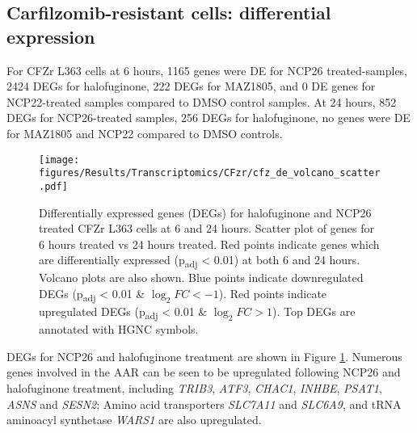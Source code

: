 
\afterpage{\clearpage}
\subsection{Carfilzomib-resistant cells: differential expression}

For CFZr L363 cells at 6 hours, 1165 genes were DE for NCP26 treated-samples, 2424 DEGs for halofuginone, 222 DEGs for MAZ1805, and 0 DE genes for NCP22-treated samples compared to DMSO control samples.
At 24 hours, 852 DEGs for NCP26-treated samples, 256 DEGs for halofuginone, no genes were DE for MAZ1805 and NCP22 compared to DMSO controls.
%
\begin{figure}[bht]
\centering
\texttt{[image: figures/Results/Transcriptomics/CFzr/cfz\_de\_volcano\_scatter.pdf]}
\caption[Differentially expressed genes CFZr L363 cells]{Differentially expressed genes (DEGs) for halofuginone and NCP26 treated CFZr L363 cells at 6 and 24 hours.
Scatter plot of genes for 6 hours treated vs 24 hours treated.
Red points indicate genes which are differentially expressed (p\textsubscript{adj} < 0.01) at both 6 and 24 hours.
Volcano plots are also shown.
Blue points indicate downregulated DEGs (p\textsubscript{adj} < 0.01 \& $\log_{2}FC < -1$).
Red points indicate upregulated DEGs (p\textsubscript{adj} < 0.01 \& $\log_{2}FC > 1$).
Top DEGs are annotated with HGNC symbols.
}
\label{fig:cfz_de}
\end{figure}
DEGs for NCP26 and halofuginone treatment are shown in Figure \ref{fig:cfz_de}.
Numerous genes involved in the AAR can be seen to be upregulated following NCP26 and halofuginone treatment, including \textit{TRIB3}, \textit{ATF3}, \textit{CHAC1}, \textit{INHBE}, \textit{PSAT1}, \textit{ASNS} and \textit{SESN2};
Amino acid transporters \textit{SLC7A11} and \textit{SLC6A9}, and tRNA aminoacyl synthetase \textit{WARS1} are also upregulated.

